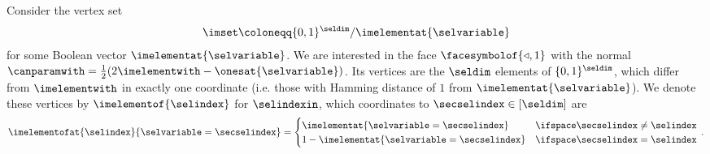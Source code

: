 \begin{example}
    \label{exa:tt_diagonal_face}
    Consider the vertex set
    \begin{align*}
        \imset
        \coloneqq \{0,1\}^{\seldim} / \imelementat{\selvariable}
    \end{align*}
    for some Boolean vector $\imelementat{\selvariable}$.
    We are interested in the face $\facesymbolof{\triangleleft,1}$ with the normal $\canparamwith=\frac{1}{2} (2\imelementwith - \onesat{\selvariable})$.
    Its vertices are the $\seldim$ elements of $\{0,1\}^{\seldim}$, which differ from $\imelementwith$ in exactly one coordinate (i.e. those with Hamming distance of $1$ from $\imelementat{\selvariable}$).
    We denote these vertices by $\imelementof{\selindex}$ for $\selindexin$, which coordinates to $\secselindex\in[\seldim]$ are
    \begin{align*}
        \imelementofat{\selindex}{\selvariable=\secselindex}
        = \begin{cases}
              \imelementat{\selvariable=\secselindex} & \ifspace \secselindex\neq\selindex \\
              1-\imelementat{\selvariable=\secselindex} & \ifspace \secselindex=\selindex
        \end{cases} \, .
    \end{align*}


\end{example}
